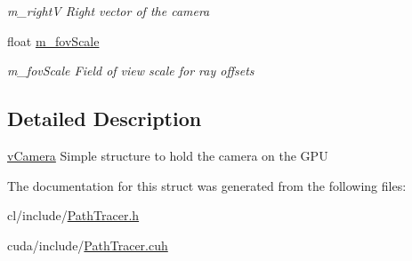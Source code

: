\begin{DoxyCompactItemize}
\begin{DoxyCompactList}\small\item\em m\-\_\-right\-V Right vector of the camera \end{DoxyCompactList}\item 
\hypertarget{structvCamera_a683785970e2632d52b0968b91e3db680}{float \hyperlink{structvCamera_a683785970e2632d52b0968b91e3db680}{m\-\_\-fov\-Scale}}\label{structvCamera_a683785970e2632d52b0968b91e3db680}

\begin{DoxyCompactList}\small\item\em m\-\_\-fov\-Scale Field of view scale for ray offsets \end{DoxyCompactList}\end{DoxyCompactItemize}


\subsection{Detailed Description}
\hyperlink{structvCamera}{v\-Camera} Simple structure to hold the camera on the G\-P\-U 

The documentation for this struct was generated from the following files\-:\begin{DoxyCompactItemize}
\item 
cl/include/\hyperlink{PathTracer_8h}{Path\-Tracer.\-h}\item 
cuda/include/\hyperlink{PathTracer_8cuh}{Path\-Tracer.\-cuh}\end{DoxyCompactItemize}
